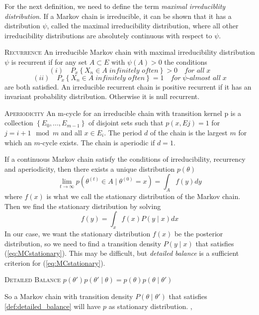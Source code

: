 For the next definition, we need to define the term \textit{maximal irreduciblity distribution}. If a Markov chain is irreducible, it can be shown that it has a distribution $\psi$, called the maximal irreducibility distribution, where all other irreducibility distributions are absolutely continuous with respect to $\psi$.  
\begin{definition}{\textsc{Recurrence}}\label{def:cont_recurrence}
An irreducible Markov chain with maximal irreducibility distribution $\psi$ is recurrent if for any set $A\subset E$ with $\psi\left(A\right)>0$ the conditions
$$(i)\quad P_x \left\{X_n \in A \; \textit{infinitely often}\right\} > 0\quad \textit{for all}\; x$$ 
$$(ii) \quad P_x\left\{X_n\in A \; \textit{infinitely often} \right\} = 1 \quad \textit{for}\;\psi \textit{-almost all} \; x$$
are both satisfied. An irreducible recurrent chain is positive recurrent if it has an invariant probability distribution.
Otherwise it is null recurrent. 
\end{definition}
\begin{definition}{\textsc{Aperiodicity}}\label{def:cont_aperiodicity}
   An m-cycle for an irreducible chain with transition kernel
p is a collection $\left\{ E_0, ... , E_{m-1}\right\}$ of disjoint sets such that $p(x, Ej) = 1$ for
$j = i + 1 \mod m$ and all $x \in E_i$. The period $d$ of the chain is the largest $m$
for which an $m$-cycle exists. The chain is aperiodic if $d = 1$.
\end{definition}




If a continuous Markov chain satisfy the conditions of irreducibility, recurrency and aperiodicity, then there exists a unique distribution $p\left(\theta\right)$   
\begin{equation*}
\lim_{t\xrightarrow{}\infty}p\left(\theta^{(t)}\in A\mid \theta^{(0)} = x\right) = \int_{A} f\left(y\right) dy
\end{equation*}
where $f\left(x\right)$ is what we call the stationary distribution of the Markov chain. Then we find the stationary distribution by solving 
\begin{equation}\label{eq:MCstationary}
    f(y) = \int_x f(x) P(y\mid x) dx 
\end{equation}In our case, we want the stationary distribution $f(x)$ be the posterior distribution, so we need to find a transition density  $P\left(y\mid x\right)$ that satisfies (\ref{eq:MCstationary}). This may be difficult, but \textit{detailed balance} is a sufficient criterion for (\ref{eq:MCstationary}). 
\theoremstyle{definition}
\begin{definition}{\textsc{Detailed Balance}} \label{def:detailed_balance}
   $ p\left(\theta'\right)p\left(\theta'\mid \theta\right) = p\left(\theta\right)p\left(\theta\mid \theta'\right)$
\end{definition}
So a Markov chain with transition density $P\left(\theta\mid \theta'\right)$ that satisfies \eqref{def:detailed_balance} will have $p$ as stationary distribution. 
\cite{MCMC_in_pract}, 




